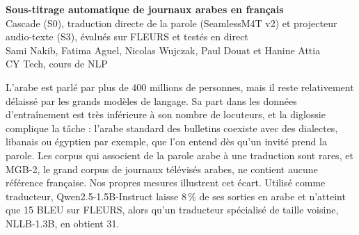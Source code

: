\documentclass[10pt]{article}
\makeatletter
\renewcommand\section{\@startsection{section}{1}{0pt}{1.0ex plus .3ex}{0.5ex}{\normalfont\large\bfseries}}
\makeatother
\begin{document}
\begin{center}
{\Large\bfseries Sous-titrage automatique de journaux arabes en français}\\[2pt]
{\normalsize Cascade (S0), traduction directe de la parole (SeamlessM4T v2) et projecteur audio-texte (S3), évalués sur FLEURS et testés en direct}\\[4pt]
Sami Nakib, Fatima Aguel, Nicolas Wujczak, Paul Douat et Hanine Attia\\
{\small CY Tech, cours de NLP}
\end{center}

\begin{abstract}
\noindent Nous comparons trois chaînes de sous-titrage français pour des journaux télévisés arabes : une cascade Whisper small puis Opus-MT (S0), le traducteur de la parole SeamlessM4T v2, et S3, qui relie un encodeur audio gelé à Qwen2.5-1.5B par un projecteur entraîné. S3 transcrit l'arabe de MGB-2 avec un WER de 14,26\,\% sur un test filtré. Comme MGB-2 n'a pas de français, la traduction est évaluée sur FLEURS (267 phrases, références humaines), où Seamless dépasse S0 de 11,2 points de chrF++. Sur le texte arabe, le traducteur spécialisé NLLB-1.3B obtient 31,3 BLEU, alors que Qwen2.5-1.5B affiné par LoRA passe seulement de 15,2 à 17,3. De bout en bout sur FLEURS, la chaîne S3 suivie de NLLB-1.3B atteint 24,6 BLEU, contre 17,4 pour Seamless. L'application Kalam, construite sur cette chaîne, a sous-titré le direct d'Al Jazeera avec un retard moyen de 3,8\,s lors d'un essai de cinq minutes.
\end{abstract}

\section{Introduction}
L'arabe est parlé par plus de 400 millions de personnes, mais il reste relativement délaissé par les grands modèles de langage. Sa part dans les données d'entraînement est très inférieure à son nombre de locuteurs, et la diglossie complique la tâche : l'arabe standard des bulletins coexiste avec des dialectes, libanais ou égyptien par exemple, que l'on entend dès qu'un invité prend la parole. Les corpus qui associent de la parole arabe à une traduction sont rares, et MGB-2, le grand corpus de journaux télévisés arabes, ne contient aucune référence française. Nos propres mesures illustrent cet écart. Utilisé comme traducteur, Qwen2.5-1.5B-Instruct laisse 8\,\% de ses sorties en arabe et n'atteint que 15 BLEU sur FLEURS, alors qu'un traducteur spécialisé de taille voisine, NLLB-1.3B, en obtient 31.
\end{document}
